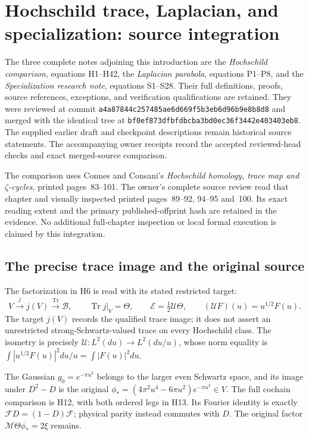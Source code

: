 \section{Hochschild trace, Laplacian, and specialization: source integration}
\label{sec:connes-pr27-source-integration}

The three complete notes adjoining this introduction are the
\emph{Hochschild comparison}, equations H1--H42, the
\emph{Laplacian parabola}, equations P1--P8, and the
\emph{Specialization research note}, equations S1--S28.
Their full definitions, proofs, source references, exceptions, and
verification qualifications are retained. They were reviewed at
commit \nolinkurl{a4a87844c257485ae6d669f5b3eb6d96b9e8b8d8}
and merged with the identical tree at
\nolinkurl{bf0ef873dfbfdbcba3bd0ec36f3442e403403eb8}.
The supplied earlier draft and checkpoint descriptions remain historical
source statements. The accompanying owner receipts record the accepted
reviewed-head checks and exact merged-source comparison.

The comparison uses Connes and Consani's
\emph{Hochschild homology, trace map and $\zeta$-cycles},
printed pages~83--101. The owner's complete source review read that
chapter and visually inspected printed pages~89--92, 94--95 and~100.
Its exact reading extent and the primary published-offprint hash are
retained in the evidence. No additional full-chapter inspection or
local formal execution is claimed by this integration.

\subsection{The precise trace image and the original source}

The factorization in H6 is read with its stated restricted target:
\[
 V\xrightarrow{j}j(V)\xrightarrow{\operatorname{Tr}}\mathscr B,
 \qquad \operatorname{Tr}j|_V=\Theta,
 \qquad \mathcal E=\tfrac12\mathcal U\Theta,
 \qquad(\mathcal UF)(u)=u^{1/2}F(u).
\]
The target $j(V)$ records the qualified trace image; it does not
assert an unrestricted strong-Schwartz-valued trace on every
Hochschild class. The isometry is precisely
$\mathcal U:L^2(du)\to L^2(du/u)$, whose norm equality is
$\int|u^{1/2}F(u)|^2du/u=\int|F(u)|^2du$.

The Gaussian $g_0=e^{-\pi u^2}$ belongs to the larger even Schwartz
space, and its image under $D^2-D$ is the original
$\phi_*=(4\pi^2u^4-6\pi u^2)e^{-\pi u^2}\in V$.
The full cochain comparison is H12, with both ordered legs in H13.
Its Fourier identity is exactly
$\mathcal FD=(1-D)\mathcal F$; physical parity instead commutes
with $D$. The original factor $\mathcal M\Theta\phi_*=2\xi$ remains.

